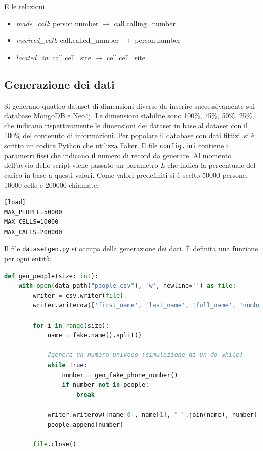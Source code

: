     E le relazioni
    \begin{itemize}
        \item \textit{made\_call}: person.number $\rightarrow$ call.calling\_number
        \item \textit{received\_call}: call.called\_number $\rightarrow$ person.number
        \item \textit{located\_in}: call.cell\_site $\rightarrow$ cell.cell\_site
    \end{itemize}

    \subsection{Generazione dei dati}
    Si generano quattro dataset di dimensioni diverse da inserire successivamente sui database
    MongoDB e Neo4j. Le dimensioni stabilite sono 100\%, 75\%, 50\%, 25\%, che indicano rispettivamente
    le dimensioni dei dataset in base al dataset con il 100\% del contenuto di informazioni.
    Per popolare il database con dati fittizi, si è scritto un codice Python che utilizza Faker.
    Il file \texttt{config.ini} contiene i parametri fissi che indicano il numero di record da generare.
    Al momento dell'avvio dello script viene passato un parametro $L$ che indica la percentuale
    del carico in base a questi valori. 
    Come valori predefiniti si è scelto 50000 persone, 10000 celle e 200000 chiamate.
    
    \begin{lstlisting}[caption=config.ini]
[load]
MAX_PEOPLE=50000
MAX_CELLS=10000
MAX_CALLS=200000
    \end{lstlisting}

    \pagebreak
    Il file \texttt{datasetgen.py} si occupa della generazione dei dati.
    È definita una funzione per ogni entità:
    
    \begin{lstlisting}[language=Python, caption=gen\_people()]
def gen_people(size: int):
    with open(data_path("people.csv"), 'w', newline='') as file:
        writer = csv.writer(file)
        writer.writerow(['first_name', 'last_name', 'full_name', 'number'])

        for i in range(size):
            name = fake.name().split()

            #genera un numero univoco (simulazione di un do-while)
            while True:
                number = gen_fake_phone_number()
                if number not in people:
                    break

            writer.writerow([name[0], name[1], " ".join(name), number])
            people.append(number)

        file.close()
    \end{lstlisting}

